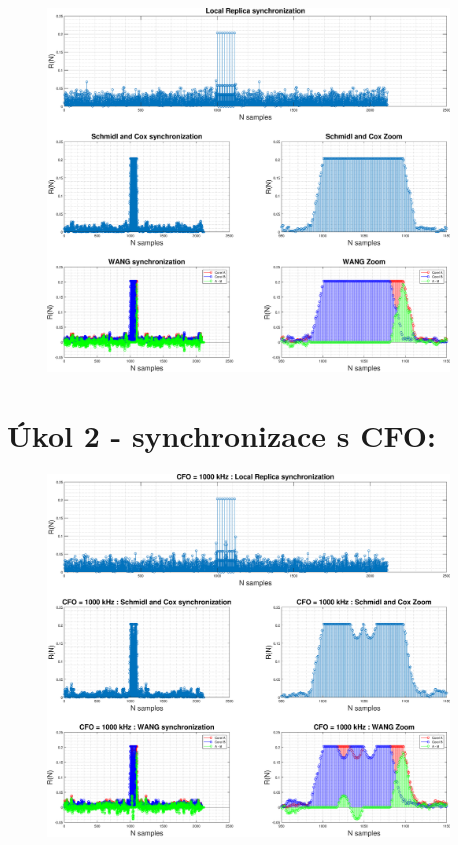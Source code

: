 \documentclass[10pt, a4paper]{article}%
\begin{document}
        \begin{figure}[ht!]
            \centering
            \includegraphics[width = 0.95\textwidth]{cviceni/sync.eps}
        \end{figure}

	\clearpage
	\section{\Large Úkol 2 - synchronizace s CFO:}

    \begin{figure}[ht!]
        \centering
        \includegraphics[width = 0.95\textwidth]{cviceni/sync_CFO.eps}
    \end{figure}
\end{document}
